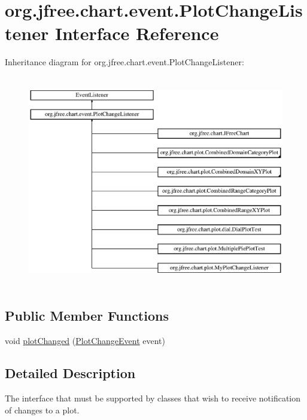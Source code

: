 \hypertarget{interfaceorg_1_1jfree_1_1chart_1_1event_1_1_plot_change_listener}{}\section{org.\+jfree.\+chart.\+event.\+Plot\+Change\+Listener Interface Reference}
\label{interfaceorg_1_1jfree_1_1chart_1_1event_1_1_plot_change_listener}
Inheritance diagram for org.\+jfree.\+chart.\+event.\+Plot\+Change\+Listener\+:\begin{figure}[H]
\begin{center}
\leavevmode
\includegraphics[height=9.302325cm]{interfaceorg_1_1jfree_1_1chart_1_1event_1_1_plot_change_listener}
\end{center}
\end{figure}
\subsection*{Public Member Functions}
\begin{DoxyCompactItemize}
\item 
void \mbox{\hyperlink{interfaceorg_1_1jfree_1_1chart_1_1event_1_1_plot_change_listener_aff1bdd2cc91287021b58a2ae67aa159d}{plot\+Changed}} (\mbox{\hyperlink{classorg_1_1jfree_1_1chart_1_1event_1_1_plot_change_event}{Plot\+Change\+Event}} event)
\end{DoxyCompactItemize}


\subsection{Detailed Description}
The interface that must be supported by classes that wish to receive notification of changes to a plot. 

